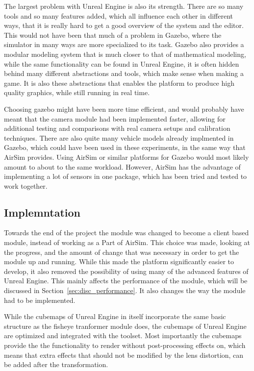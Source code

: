 The largest problem with Unreal Engine is also its strength. There are so many tools and so many features added, which all influence each other in different ways, that it is really hard to get a good overview of the system and the editor. This would not have been that much of a problem in Gazebo, where the simulator in many ways are more specialized to its task. Gazebo also provides a modular modeling system that is much closer to that of mathematical modeling, while the same functionality can be found in Unreal Engine, it is often hidden behind many different abstractions and tools, which make sense when making a game. It is also these abstractions that enables the platform to produce high quality graphics, while still running in real time.

Choosing gazebo might have been more time efficient, and would probably have meant that the camera module had been implemented faster, allowing for additional testing and comparisons with real camera setups and calibration techniques. There are also quite many vehicle models already implmented in Gazebo, which could have been used in these experiments, in the same way that AirSim provides. Using AirSim or similar platforms for Gazebo would most likely amount to about to the same workload. However, AirSim has the advantage of implementing a lot of sensors in one package, which has been tried and tested to work together.

\subsection{Implemntation}

Towards the end of the project the module was changed to become a client based module, instead of working as a Part of AirSim. This choice was made, looking at the progress, and the amount of change that was necessary in order to get the module up and running. While this made the platform significantly easier to develop, it also removed the possibility of using many of the advanced features of Unreal Engine. This mainly affects the performance of the module, which will be discussed in Section~\ref{sec:disc_performance}. It also changes the way the module had to be implemented.

While the cubemaps of Unreal Engine in itself incorporate the same basic structure as the fisheye tranformer module does, the cubemaps of Unreal Engine are optimized and integrated with the toolset. Most importantly the cubemaps provide the the functionality to render without post-processing effects on, which means that extra effects that should not be modified by the lens distortion, can be added after the transformation.

